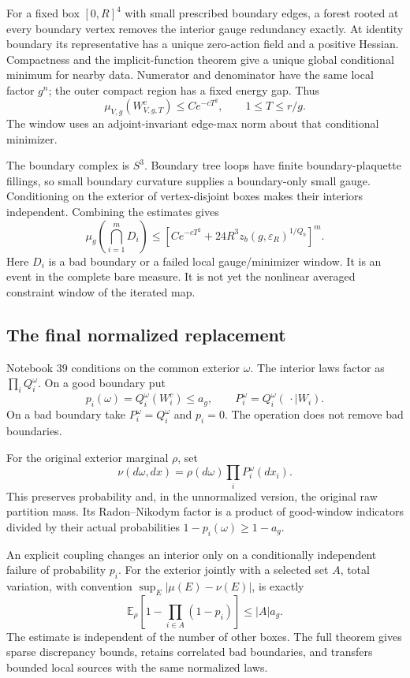 For a fixed box \([0,R]^4\) with small prescribed
boundary edges, a forest rooted at every boundary
vertex removes the interior gauge redundancy exactly.
At identity boundary its representative has a unique
zero-action field and a positive Hessian. Compactness
and the implicit-function theorem give a unique global
conditional minimum for nearby data. Numerator and
denominator have the same local factor \(g^n\);
the outer compact region has a fixed energy gap. Thus
\[
      \mu_{V,g}(W_{V,g,T}^c)\le Ce^{-cT^2},
      \qquad 1\le T\le r/g.
\]
The window uses an adjoint-invariant edge-max norm
about that conditional minimizer.

The boundary complex is \(S^3\). Boundary tree loops
have finite boundary-plaquette fillings, so small
boundary curvature supplies a boundary-only small
gauge. Conditioning on the exterior of vertex-disjoint
boxes makes their interiors independent. Combining
the estimates gives
\[
 \mu_g\left(\bigcap_{i=1}^m D_i\right)
 \le \left[Ce^{-cT^2}
       +24R^3 z_b(g,\varepsilon_R)^{1/Q_b}\right]^m.
\]
Here \(D_i\) is a bad boundary or a failed local
gauge/minimizer window. It is an event in the complete
bare measure. It is not yet the nonlinear averaged
constraint window of the iterated map.

\subsection{The final normalized replacement}

Notebook 39 conditions on the common exterior \(\omega\).
The interior laws factor as \(\prod_iQ_i^\omega\).
On a good boundary put
\[
 p_i(\omega)=Q_i^\omega(W_i^c)\le a_g,\qquad
 P_i^\omega=Q_i^\omega(\,\cdot\mid W_i).
\]
On a bad boundary take \(P_i^\omega=Q_i^\omega\) and
\(p_i=0\). The operation does not remove bad boundaries.

For the original exterior marginal \(\rho\), set
\[
          \nu(d\omega,dx)=\rho(d\omega)\prod_iP_i^\omega(dx_i).
\]
This preserves probability and, in the unnormalized
version, the original raw partition mass.
Its Radon--Nikodym factor is a product of good-window
indicators divided by their actual probabilities
\(1-p_i(\omega)\ge1-a_g\).

An explicit coupling changes an interior only on a
conditionally independent failure of probability \(p_i\).
For the exterior jointly with a selected set \(A\),
total variation, with convention
\(\sup_E|\mu(E)-\nu(E)|\), is exactly
\[
 \mathbb E_\rho\left[1-\prod_{i\in A}(1-p_i)\right]
 \le |A|a_g.
\]
The estimate is independent of the number of other
boxes. The full theorem gives sparse discrepancy
bounds, retains correlated bad boundaries, and
transfers bounded local sources with the same
normalized laws.

